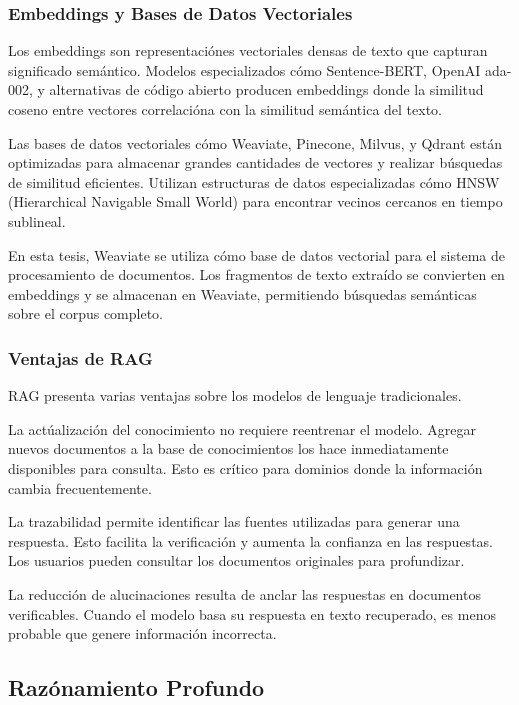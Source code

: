 \documentclass[12pt,a4paper,twoside]{book}
\begin{document}
\subsubsection{Embeddings y Bases de Datos Vectoriales}

Los embeddings son representaciónes vectoriales densas de texto que capturan significado semántico. Modelos especializados cómo Sentence-BERT, OpenAI ada-002, y alternativas de código abierto producen embeddings donde la similitud coseno entre vectores correlacióna con la similitud semántica del texto.

Las bases de datos vectoriales cómo Weaviate, Pinecone, Milvus, y Qdrant están optimizadas para almacenar grandes cantidades de vectores y realizar búsquedas de similitud eficientes. Utilizan estructuras de datos especializadas cómo HNSW (Hierarchical Navigable Small World) para encontrar vecinos cercanos en tiempo sublineal.

En esta tesis, Weaviate se utiliza cómo base de datos vectorial para el sistema de procesamiento de documentos. Los fragmentos de texto extraído se convierten en embeddings y se almacenan en Weaviate, permitiendo búsquedas semánticas sobre el corpus completo.

\subsubsection{Ventajas de RAG}

RAG presenta varias ventajas sobre los modelos de lenguaje tradicionales.

La actúalización del conocimiento no requiere reentrenar el modelo. Agregar nuevos documentos a la base de conocimientos los hace inmediatamente disponibles para consulta. Esto es crítico para dominios donde la información cambia frecuentemente.

La trazabilidad permite identificar las fuentes utilizadas para generar una respuesta. Esto facilita la verificación y aumenta la confianza en las respuestas. Los usuarios pueden consultar los documentos originales para profundizar.

La reducción de alucinaciones resulta de anclar las respuestas en documentos verificables. Cuando el modelo basa su respuesta en texto recuperado, es menos probable que genere información incorrecta.

\subsection{Razónamiento Profundo}
\end{document}

